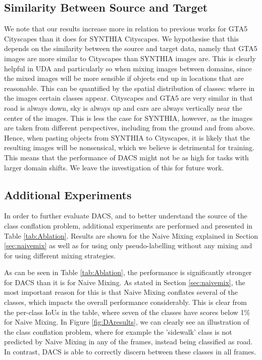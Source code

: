 \documentclass[10pt,twocolumn,letterpaper]{article}
\begin{document}

\subsection{Similarity Between Source and Target}
We note that our results increase more in relation to previous works for GTA5  Cityscapes than it does for SYNTHIA  Cityscapes. We hypothesise that this depends on the similarity between the source and target data, namely that GTA5 images are more similar to Cityscapes than SYNTHIA images are. This is clearly helpful in UDA and particularly so when mixing images between domains, since the mixed images will be more sensible if objects end up in locations that are reasonable. This can be quantified by the spatial distribution of classes: where in the images certain classes appear. Cityscapes and GTA5 are very similar in that road is always down, sky is always up and cars are always vertically near the center of the images. This is less the case for SYNTHIA, however, as the images are taken from different perspectives, including from the ground and from above. Hence, when pasting objects from SYNTHIA to Cityscapes, it is likely that the resulting images will be nonsensical, which we believe is detrimental for training. This means that the performance of DACS might not be as high for tasks with larger domain shifts. We leave the investigation of this for future work.


\subsection{Additional Experiments}
\label{sec:ablation}
In order to further evaluate DACS, and to better understand the source of the class conflation problem, additional experiments are performed and presented in Table \ref{tab:Ablation}. Results are shown for the Naive Mixing explained in Section \ref{sec:naivemix} as well as for using only pseudo-labelling without any mixing and for using different mixing strategies.


As can be seen in Table \ref{tab:Ablation}, the performance is significantly stronger for DACS than it is for Naive Mixing. As stated in Section \ref{sec:naivemix}, the most important reason for this is that Naive Mixing conflates several of the classes, which impacts the overall performance considerably. This is clear from the per-class IoUs in the table, where seven of the classes have scores below 1\% for Naive Mixing. In Figure \ref{fig:DAresults}, we can clearly see an illustration of the class conflation problem, where for example the 'sidewalk' class is not predicted by Naive Mixing in any of the frames, instead being classified as road. In contrast, DACS is able to correctly discern between these classes in all frames.
\end{document}
